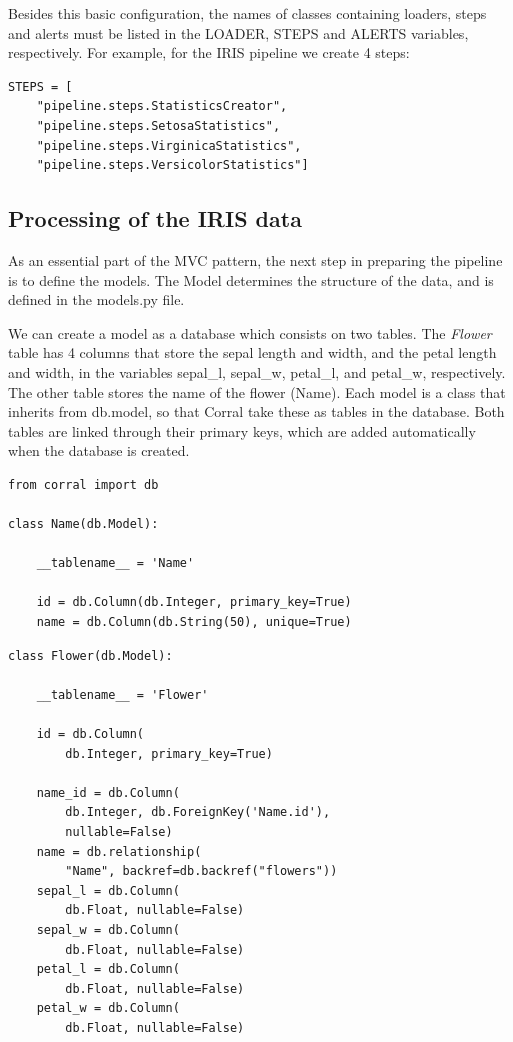 \documentclass[final,5p,times,twocolumn,authoryear]{elsarticle}
\begin{document}
Besides this basic configuration, the names of classes containing
loaders, steps and alerts must be listed in the LOADER, STEPS and
ALERTS variables, respectively.
%
For example, for the IRIS pipeline we create 4 steps:

\begin{verbatim}
STEPS = [
    "pipeline.steps.StatisticsCreator",
    "pipeline.steps.SetosaStatistics",
    "pipeline.steps.VirginicaStatistics",
    "pipeline.steps.VersicolorStatistics"]
\end{verbatim}


\subsection{Processing of the IRIS data}

As an essential part of the MVC pattern, the
next step in preparing the pipeline is to define the models.
%
The Model determines the structure of the data, and is defined
in the models.py file.

We can create a model as a database which consists on two tables.
%
The \textit{Flower} table has 4 columns that store the sepal length and
width, and the petal length and width, in the variables sepal\_l,
sepal\_w, petal\_l, and petal\_w, respectively.
%
The other table stores
the name of the flower (Name).
%
Each model is a class that inherits from db.model, so that Corral take
these as tables in the database.
%
Both tables are linked through their primary keys, which are added
automatically when the database is created.

\begin{verbatim}
from corral import db

class Name(db.Model):

    __tablename__ = 'Name'

    id = db.Column(db.Integer, primary_key=True)
    name = db.Column(db.String(50), unique=True)
\end{verbatim}

\begin{verbatim}
class Flower(db.Model):

    __tablename__ = 'Flower'

    id = db.Column(
        db.Integer, primary_key=True)

    name_id = db.Column(
        db.Integer, db.ForeignKey('Name.id'),
        nullable=False)
    name = db.relationship(
        "Name", backref=db.backref("flowers"))
    sepal_l = db.Column(
        db.Float, nullable=False)
    sepal_w = db.Column(
        db.Float, nullable=False)
    petal_l = db.Column(
        db.Float, nullable=False)
    petal_w = db.Column(
        db.Float, nullable=False)
\end{verbatim}
\end{document}
